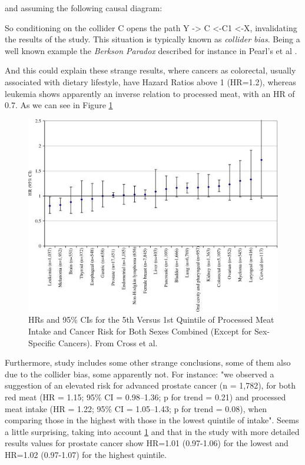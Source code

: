 \documentclass{article}
\begin{document}
and assuming the following causal diagram:


So conditioning on the collider C opens the path Y -> C <-C1 <-X, invalidating the results of the study. This situation is typically known as \textit{collider bias}. Being a well known example the \textit{Berkson Paradox} described for instance in Pearl's et al \cite{bookofwhy}.

And this could explain these strange results, where cancers as colorectal, usually associated with dietary lifestyle, have Hazard Ratios above 1 (HR=1.2), whereas leukemia shows apparently an inverse relation to processed meat, with an HR of 0.7. As we can see in Figure \ref{fig:cross}
\begin{figure}
  \includegraphics[scale=0.75]{tileshop2}
  \caption{HRs and 95\% CIs for the 5th Versus 1st Quintile of Processed Meat Intake and Cancer Risk for Both Sexes Combined (Except for Sex-Specific Cancers). From Cross et al. \cite{cross}}
  \label{fig:cross}
\end{figure}


Furthermore, study includes some other strange conclusions, some of them also due to the collider bias, some apparently not. For instance: "we observed a suggestion of an elevated risk for advanced prostate cancer (n = 1,782), for both red meat (HR = 1.15; 95\% CI = 0.98–1.36; p for trend = 0.21) and processed meat intake (HR = 1.22; 95\% CI = 1.05–1.43; p for trend = 0.08), when comparing those in the highest with those in the lowest quintile of intake". Seems a little surprising, taking into account \ref{fig:cross} and that in the study with more detailed results values for prostate cancer show HR=1.01 (0.97-1.06) for the lowest and HR=1.02 (0.97-1.07) for the highest quintile.
\end{document}
